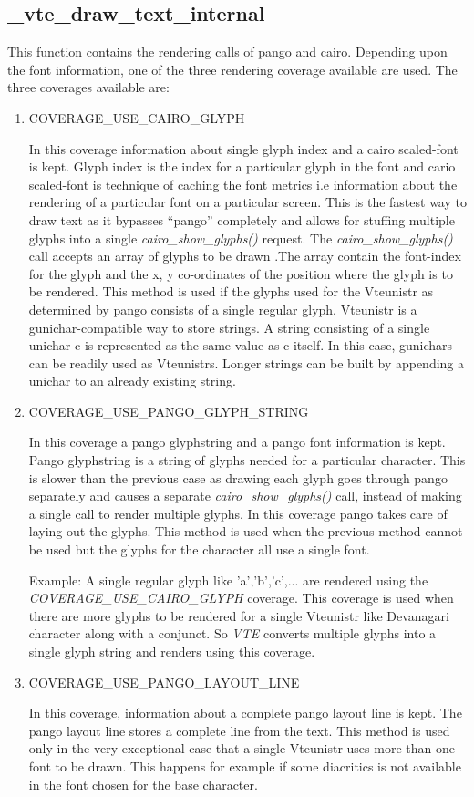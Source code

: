 \subsection{\_vte\_draw\_text\_internal}
This function contains the rendering calls of pango and cairo. Depending upon the font information, one of the three rendering coverage available are used. The three coverages available are:
\pagebreak
\begin{enumerate}
\item COVERAGE\_USE\_CAIRO\_GLYPH

In this coverage information about single glyph index and a cairo scaled-font is kept. Glyph index is the index for a particular glyph in the font and cario scaled-font is technique of caching the font metrics i.e information about the rendering of a particular font on a particular screen. This is the fastest way to draw text as it bypasses ``pango'' completely and allows for stuffing multiple glyphs into a single \textit{cairo\_show\_glyphs()} request. The \textit{cairo\_show\_glyphs()} call accepts an array of glyphs to be drawn .The array contain the font-index for the glyph and the x, y co-ordinates of the position where the glyph is to be rendered. This method is used if the glyphs used for the Vteunistr as determined by pango consists of a single regular glyph. Vteunistr is a gunichar-compatible way to store strings. A string consisting of a single unichar c is represented as the same value as c itself.  In this case, gunichars can be readily used as Vteunistrs. Longer strings can be built by appending a unichar to an already existing string.

\item COVERAGE\_USE\_PANGO\_GLYPH\_STRING

In this coverage a pango glyphstring and a pango font information is kept. Pango glyphstring is a string of glyphs needed for a particular character. This is slower than the previous case as drawing each glyph goes through pango separately and causes a separate \textit{cairo\_show\_glyphs()} call, instead of making a single call to render multiple glyphs. In this coverage pango takes care of laying out the glyphs. This method is used when the previous method cannot be used but the glyphs for the character all use a single font.

Example: A single regular glyph like 'a','b','c',... are rendered using the \textit{COVERAGE\_USE\_CAIRO\_GLYPH} coverage. This coverage is used when there are more glyphs to be rendered for a single Vteunistr like Devanagari character along with a conjunct. So \textit{VTE} converts multiple glyphs into a single glyph string and renders using this coverage.

\item COVERAGE\_USE\_PANGO\_LAYOUT\_LINE

In this coverage, information about a complete pango layout line is kept. The pango layout line stores a complete line from the text. This method is used only in the very exceptional case that a single Vteunistr uses more than one font to be drawn. This happens for example if some diacritics is not available in the font chosen for the base character.

\end{enumerate}
